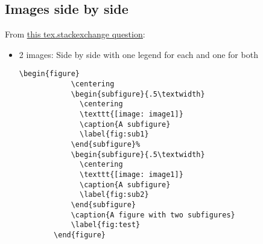 \subsection{Images side by side}
\par From \href{https://tex.stackexchange.com/questions/37581/latex-figures-side-by-side}{\ul{this tex.stackexchange question}}:
\begin{itemize}
    \item 2 images: Side by side with one legend for each and one for both
    \begin{lstlisting}[language=Tex, numbers=none]
        \begin{figure}
            \centering
            \begin{subfigure}{.5\textwidth}
              \centering
              \texttt{[image: image1]}
              \caption{A subfigure}
              \label{fig:sub1}
            \end{subfigure}%
            \begin{subfigure}{.5\textwidth}
              \centering
              \texttt{[image: image1]}
              \caption{A subfigure}
              \label{fig:sub2}
            \end{subfigure}
            \caption{A figure with two subfigures}
            \label{fig:test}
        \end{figure}
    \end{lstlisting}
        

\end{itemize}
